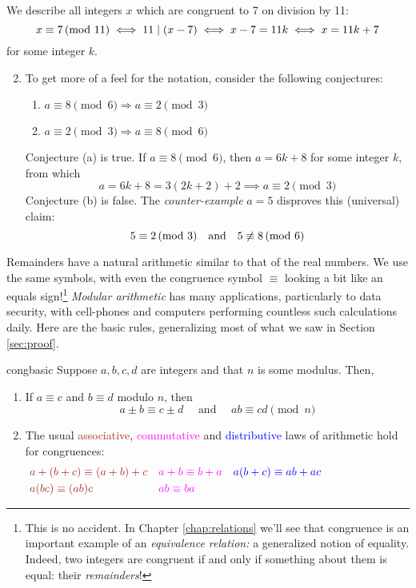 \goodbreak


\begin{examples}{}{}
\exstart We describe all integers $x$ which are congruent to 7 on division by 11:
	\[
		x\equiv 7\negthickspace\pmod{11}\iff 11\mid(x-7) \iff x-7=11k\iff x=11k+7
	\]
	for some integer $k$.
	\goodbreak

\begin{enumerate}\setcounter{enumi}{1}
  \item To get more of a feel for the notation, consider the following conjectures:
	\begin{enumerate}
	    \item $a\equiv 8\pmod 6\Longrightarrow a\equiv 2\pmod 3$
	    \item $a\equiv 2\pmod 3\Longrightarrow a\equiv 8\pmod 6$
	\end{enumerate}
	Conjecture (a) is true. If $a\equiv 8\pmod 6$, then $a=6k+8$ for some integer $k$, from which
		\[
			a=6k+8 =3(2k+2)+2 \implies a\equiv 2\pmod 3
		\]
		Conjecture (b) is false. The \emph{counter-example} $a=5$ disproves this (universal) claim:
		\[
			5\equiv 2\negthickspace\pmod{3} \quad\text{and}\quad 5\not\equiv 8\negthickspace\pmod{6}
		\]
	\end{enumerate}
\end{examples}




Remainders have a natural arithmetic similar to that of the real numbers. We use the same symbols, with even the congruence symbol $\equiv$ looking a bit like an equals sign!\footnote{This is no accident. In Chapter \ref{chap:relations} we'll see that congruence is an important example of an \emph{equivalence relation:} a generalized notion of equality. Indeed, two integers are congruent if and only if something about them is equal: their \emph{remainders}!} \emph{Modular arithmetic} has many applications, particularly to data security, with cell-phones and computers performing countless such calculations daily. Here are the basic rules, generalizing most of what we saw in Section \ref{sec:proof}.

\begin{thm}{}{congbasic}
	Suppose $a,b,c,d$ are integers and that $n$ is some modulus. Then,
	\begin{enumerate}
	  \item If $a\equiv c$ and $b\equiv d$ modulo $n$, then
	  \[
	  	a\pm b\equiv c\pm d\quad\text{ and }\quad ab\equiv cd \pmod n
	  \]
	  \item The usual \textcolor{Brown}{associative}, \textcolor{Magenta}{commutative} and \textcolor{blue}{distributive} laws of arithmetic hold for congruences:
		\begin{align*}
			&\textcolor{Brown}{a+(b+c)\equiv (a+b)+c}
			&&\textcolor{Magenta}{a+b\equiv b+a}
			&&\textcolor{blue}{a(b+c)\equiv ab+ac} \hspace{75pt}\\
			&\textcolor{Brown}{a(bc)\equiv (ab)c}
			&&\textcolor{Magenta}{ab\equiv ba}
		\end{align*}
	\end{enumerate}
\end{thm}

